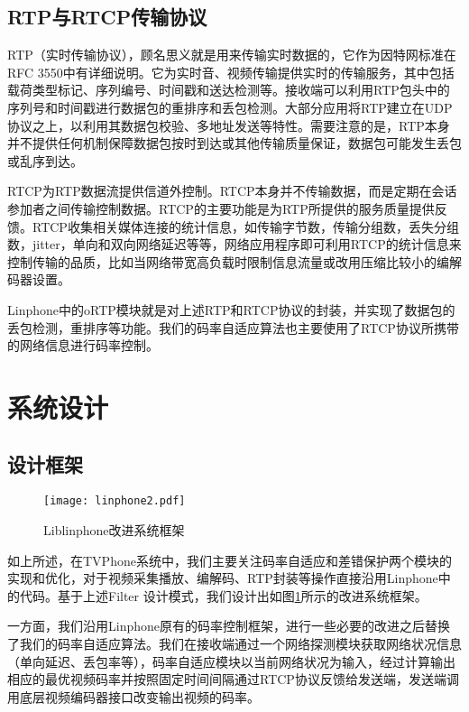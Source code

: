     \subsection{RTP与RTCP传输协议}
    RTP（实时传输协议），顾名思义就是用来传输实时数据的，它作为因特网标准在RFC 3550\cite{jacobson2003rtp}中有详细说明。它为实时音、视频传输提供实时的传输服务，其中包括载荷类型标记、序列编号、时间戳和送达检测等。接收端可以利用RTP包头中的序列号和时间戳进行数据包的重排序和丢包检测。大部分应用将RTP建立在UDP协议之上，以利用其数据包校验、多地址发送等特性。需要注意的是，RTP本身并不提供任何机制保障数据包按时到达或其他传输质量保证，数据包可能发生丢包或乱序到达。

    RTCP为RTP数据流提供信道外控制。RTCP本身并不传输数据，而是定期在会话参加者之间传输控制数据。RTCP的主要功能是为RTP所提供的服务质量提供反馈。RTCP收集相关媒体连接的统计信息，如传输字节数，传输分组数，丢失分组数，jitter，单向和双向网络延迟等等，网络应用程序即可利用RTCP的统计信息来控制传输的品质，比如当网络带宽高负载时限制信息流量或改用压缩比较小的编解码器设置。

    Linphone中的oRTP模块就是对上述RTP和RTCP协议的封装，并实现了数据包的丢包检测，重排序等功能。我们的码率自适应算法也主要使用了RTCP协议所携带的网络信息进行码率控制。

\section{系统设计}


\subsection{设计框架}

\begin{figure}[htbp]
  \centering
  \texttt{[image: linphone2.pdf]}
  \caption{Liblinphone改进系统框架}
  \label{fig:linphone2}
\end{figure}

如上所述，在TVPhone系统中，我们主要关注码率自适应和差错保护两个模块的实现和优化，对于视频采集播放、编解码、RTP封装等操作直接沿用Linphone中的代码。基于上述Filter 设计模式，我们设计出如图\ref{fig:linphone2}所示的改进系统框架。

一方面，我们沿用Linphone原有的码率控制框架，进行一些必要的改进之后替换了我们的码率自适应算法。我们在接收端通过一个网络探测模块获取网络状况信息（单向延迟、丢包率等），码率自适应模块以当前网络状况为输入，经过计算输出相应的最优视频码率并按照固定时间间隔通过RTCP协议反馈给发送端，发送端调用底层视频编码器接口改变输出视频的码率。

